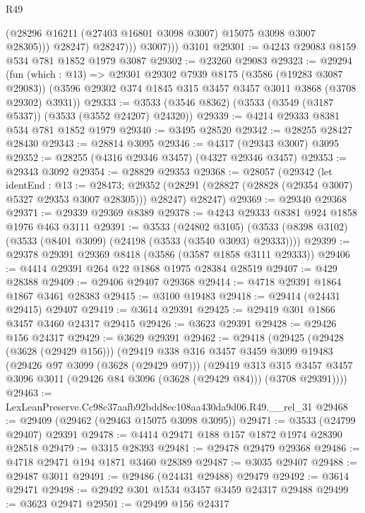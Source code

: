 \begin{lexlean}{R49}
\begin{coremodule}
                    (@28296 @16211 (@27403 @16801 @3098 @3007) @15075 @3098 @3007 @28305)))
                @28247)
              @28247)))
          @3007)))
    @3101
@29301 := @4243 @29083 @8159 @534 @781 @1852 @1979 @3087
@29302 := @23260 @29083
@29323 := @29294
    (fun (which : @13) =>
    @29301
      @29302
      @7939
      @8175
      (@3586 (@19283 @3087 @29083))
      (@3596 @29302 @374 @1845 @315 @3457 @3457 @3011 @3868 (@3708 @29302) @3931))
@29333 := @3533 (@3546 @8362) (@3533 (@3549 (@3187 @5337)) (@3533 (@3552 @24207) @24320))
@29339 := @4214 @29333 @8381 @534 @781 @1852 @1979
@29340 := @3495 @28520
@29342 := @28255 @28427 @28430
@29343 := @28814 @3095
@29346 := @4317 (@29343 @3007) @3095
@29352 := @28255 (@4316 @29346 @3457) (@4327 @29346 @3457)
@29353 := @29343 @3092
@29354 := @28829 @29353
@29368 := @28057
    (@29342
      (let identEnd : @13 := @28473;
      @29352 (@28291 (@28827 (@28828 (@29354 @3007) @5327 @29353 @3007 @28305))) @28247)
      @28247)
@29369 := @29340 @29368
@29371 := @29339 @29369 @8389
@29378 := @4243 @29333 @8381 @924 @1858 @1976 @463 @3111
@29391 := @3533
    (@24802 @3105)
    (@3533 (@8398 @3102) (@3533 (@8401 @3099) (@24198 (@3533 (@3540 @3093) @29333))))
@29399 := @29378 @29391 @29369 @8418 (@3586 (@3587 @1858 @3111 @29333))
@29406 := @4414 @29391 @264 @22 @1868 @1975 @28384 @28519
@29407 := @429 @28388
@29409 := @29406 @29407 @29368
@29414 := @4718 @29391 @1864 @1867 @3461 @28383
@29415 := @3100 @19483
@29418 := @29414 (@24431 @29415) @29407
@29419 := @3614 @29391
@29425 := @29419 @301 @1866 @3457 @3460 @24317 @29415
@29426 := @3623 @29391
@29428 := @29426 @156 @24317
@29429 := @3629 @29391
@29462 := @29418
    (@29425
      (@29428 (@3628 (@29429 @156)))
      (@29419
        @338
        @316
        @3457
        @3459
        @3099
        @19483
        (@29426 @97 @3099 (@3628 (@29429 @97)))
        (@29419
          @313
          @315
          @3457
          @3457
          @3096
          @3011
          (@29426 @84 @3096 (@3628 (@29429 @84)))
          (@3708 @29391))))
@29463 := LexLeanPreserve.Cc98c37aafb92bdd8ec108aa430da9d06.R49.__rel_31
@29468 := @29409 (@29462 (@29463 @15075 @3098 @3095))
@29471 := @3533 (@24799 @29407) @29391
@29478 := @4414 @29471 @188 @157 @1872 @1974 @28390 @28518
@29479 := @3315 @28393
@29481 := @29478 @29479 @29368
@29486 := @4718 @29471 @194 @1871 @3460 @28389
@29487 := @3035 @29407
@29488 := @29487 @3011
@29491 := @29486 (@24431 @29488) @29479
@29492 := @3614 @29471
@29498 := @29492 @301 @1534 @3457 @3459 @24317 @29488
@29499 := @3623 @29471
@29501 := @29499 @156 @24317

\end{coremodule}
\end{lexlean}
